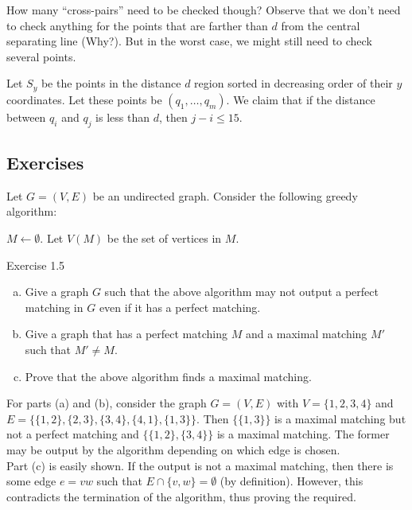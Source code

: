 How many ``cross-pairs'' need to be checked though? Observe that we don't need to check anything for the points that are farther than $d$ from the central separating line (Why?). But in the worst case, we might still need to check several points.

\begin{lemma}
	Let $S_y$ be the points in the distance $d$ region sorted in decreasing order of their $y$ coordinates. Let these points be $(q_1,\ldots,q_m)$. We claim that if the distance between $q_i$ and $q_j$ is less than $d$, then $j-i\leq 15$.
\end{lemma}

\subsection{Exercises}

\begin{exercise}
	Let $G=(V,E)$ be an undirected graph. Consider the following greedy algorithm:
	\begin{algorithm*}
		\DontPrintSemicolon
		\SetNoFillComment
		$M\gets\emptyset$. Let $V(M)$ be the set of vertices in $M$.\;
		\caption{Exercise 1.5}\label{algo: ex 1.5}
	\end{algorithm*}

	\begin{enumerate}[(a)]
		\item Give a graph $G$ such that the above algorithm may not output a perfect matching in $G$ even if it has a perfect matching.
		\item Give a graph that has a perfect matching $M$ and a maximal matching $M'$ such that $M'\neq M$.
		\item Prove that the above algorithm finds a maximal matching.
	\end{enumerate}
\end{exercise}
\begin{solution}
	For parts (a) and (b), consider the graph $G=(V,E)$ with $V=\{1,2,3,4\}$ and $E=\{\{1,2\},\{2,3\},\{3,4\},\{4,1\},\{1,3\}\}$. Then $\{\{1,3\}\}$ is a maximal matching but not a perfect matching and $\{\{1,2\},\{3,4\}\}$ is a maximal matching. The former may be output by the algorithm depending on which edge is chosen.\\
	Part (c) is easily shown. If the output is not a maximal matching, then there is some edge $e=vw$ such that $E\cap\{v,w\}=\emptyset$ (by definition). However, this contradicts the termination of the algorithm, thus proving the required.
\end{solution}

